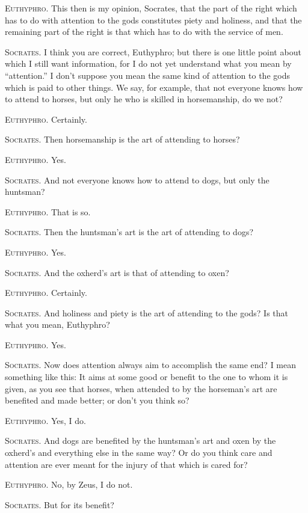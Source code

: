 \textsc{Euthyphro}. This then is my opinion, Socrates, that the part
of the right which has to do with attention to the gods constitutes
piety and holiness, and that the remaining part of the right is that
which has to do with the service of men.

\textsc{Socrates}. I think you are correct, Euthyphro; but there is
one little point about which I still want information, for I do not
yet understand what you mean by ``attention.'' I don't suppose you
mean the same kind of attention to the gods which is paid to other
things. We say, for example, that not everyone knows how to attend to
horses, but only he who is skilled in horsemanship, do we not?

\textsc{Euthyphro}. Certainly.

\textsc{Socrates}. Then horsemanship is the art of attending to
horses?

\textsc{Euthyphro}. Yes.

\textsc{Socrates}. And not everyone knows how to attend to dogs, but
only the huntsman?

\textsc{Euthyphro}. That is so.

\textsc{Socrates}. Then the huntsman's art is the art of attending to
dogs?

\textsc{Euthyphro}. Yes.

\textsc{Socrates}. And the oxherd's art is that of attending to oxen?

\textsc{Euthyphro}. Certainly.

\textsc{Socrates}. And holiness and piety is the art of attending to
the gods? Is that what you mean, Euthyphro?

\textsc{Euthyphro}. Yes.

\textsc{Socrates}. Now does attention always aim to accomplish the
same end? I mean something like this: It aims at some good or benefit
to the one to whom it is given, as you see that horses, when attended
to by the horseman's art are benefited and made better; or don't you
think so?

\textsc{Euthyphro}. Yes, I do.

\textsc{Socrates}. And dogs are benefited by the huntsman's art and
oxen by the oxherd's and everything else in the same way? Or do you
think care and attention are ever meant for the injury of that which
is cared for?

\textsc{Euthyphro}. No, by Zeus, I do not.

\textsc{Socrates}. But for its benefit?

